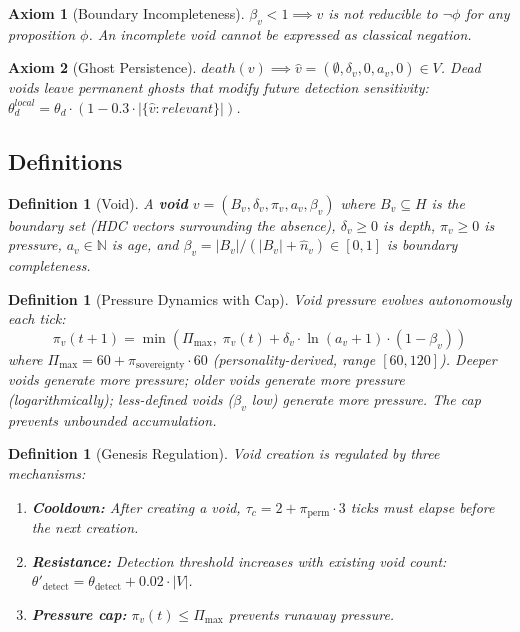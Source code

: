 \documentclass[11pt]{article}
\newtheorem{definition}[theorem]{Definition}
\newtheorem{axiom}{Axiom}[section]
\begin{document}
\begin{axiom}[Boundary Incompleteness]
\label{ax:void-incomplete}
$\beta_v < 1 \implies v$ is not reducible to $\neg\phi$ for any proposition $\phi$. An incomplete void cannot be expressed as classical negation.
\end{axiom}

\begin{axiom}[Ghost Persistence]
\label{ax:void-ghost}
$death(v) \implies \hat{v} = (\emptyset, \delta_v, 0, a_v, 0) \in V$. Dead voids leave permanent ghosts that modify future detection sensitivity: $\theta_d^{local} = \theta_d \cdot (1 - 0.3 \cdot |\{\hat{v}: relevant\}|)$.
\end{axiom}

\subsection{Definitions}

\begin{definition}[Void]
A \textbf{void} $v = (B_v, \delta_v, \pi_v, a_v, \beta_v)$ where $B_v \subseteq H$ is the boundary set (HDC vectors surrounding the absence), $\delta_v \geq 0$ is depth, $\pi_v \geq 0$ is pressure, $a_v \in \mathbb{N}$ is age, and $\beta_v = |B_v| / (|B_v| + \hat{n}_v) \in [0,1]$ is boundary completeness.
\end{definition}

\begin{definition}[Pressure Dynamics with Cap]
\label{def:pressure}
Void pressure evolves autonomously each tick:
\begin{equation}
\pi_v(t+1) = \min\!\left(\Pi_{\max},\; \pi_v(t) + \delta_v \cdot \ln(a_v + 1) \cdot (1 - \beta_v)\right)
\label{eq:pressure}
\end{equation}
where $\Pi_{\max} = 60 + \pi_{\text{sovereignty}} \cdot 60$ (personality-derived, range $[60, 120]$). Deeper voids generate more pressure; older voids generate more pressure (logarithmically); less-defined voids ($\beta_v$ low) generate more pressure. The cap prevents unbounded accumulation.
\end{definition}

\begin{definition}[Genesis Regulation]
\label{def:genesis}
Void creation is regulated by three mechanisms:
\begin{enumerate}
\item \textbf{Cooldown:} After creating a void, $\tau_c = 2 + \pi_{\text{perm}} \cdot 3$ ticks must elapse before the next creation.
\item \textbf{Resistance:} Detection threshold increases with existing void count: $\theta'_{\text{detect}} = \theta_{\text{detect}} + 0.02 \cdot |V|$.
\item \textbf{Pressure cap:} $\pi_v(t) \leq \Pi_{\max}$ prevents runaway pressure.
\end{enumerate}
\end{definition}
\end{document}
